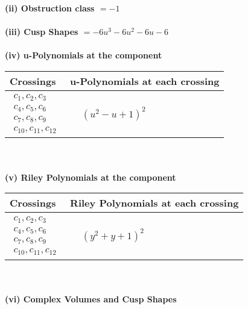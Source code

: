 \documentclass[1p]{elsarticle_modified}
\theoremstyle{definition}
\begin{document}
\flushleft \textbf{(ii) Obstruction class $= -1$}\\~\\
\flushleft \textbf{(iii) Cusp Shapes $= -6 u^3-6 u^2-6 u-6$}\\~\\
\newpage\renewcommand{\arraystretch}{1}
\flushleft \textbf{(iv) u-Polynomials at the component}\newline \\
\begin{tabular}{m{50pt}|m{274pt}}
Crossings & \hspace{64pt}u-Polynomials at each crossing \\
\hline $$\begin{aligned}c_{1},c_{2},c_{3}\\c_{4},c_{5},c_{6}\\c_{7},c_{8},c_{9}\\c_{10},c_{11},c_{12}\end{aligned}$$&$\begin{aligned}
&(u^2- u+1)^2
\end{aligned}$\\
\hline
\end{tabular}\\~\\
\newpage\renewcommand{\arraystretch}{1}
\flushleft \textbf{(v) Riley Polynomials at the component}\newline \\
\begin{tabular}{m{50pt}|m{274pt}}
Crossings & \hspace{64pt}Riley Polynomials at each crossing \\
\hline $$\begin{aligned}c_{1},c_{2},c_{3}\\c_{4},c_{5},c_{6}\\c_{7},c_{8},c_{9}\\c_{10},c_{11},c_{12}\end{aligned}$$&$\begin{aligned}
&(y^2+y+1)^2
\end{aligned}$\\
\hline
\end{tabular}\\~\\
\newpage\flushleft \textbf{(vi) Complex Volumes and Cusp Shapes}
\end{document}
